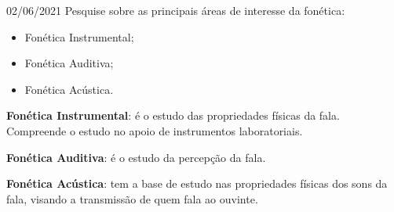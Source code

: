 \documentclass{SchoolBook}
\begin{document}
    \begin{day}{02/06/2021}
        Pesquise sobre as principais áreas de interesse da fonética:
        
        \begin{itemize}[nosep]
            \item Fonética Instrumental;
            \item Fonética Auditiva;
            \item Fonética Acústica.
        \end{itemize}
        
        \noindent\textbf{Fonética Instrumental}: é o estudo das propriedades físicas da fala. Compreende o estudo no apoio de instrumentos laboratoriais.
        
        \noindent\textbf{Fonética Auditiva}: é o estudo da percepção da fala.
        
        \noindent\textbf{Fonética Acústica}: tem a base de estudo nas propriedades físicas dos sons da fala, visando a transmissão de quem fala ao ouvinte.
    \end{day}
\end{document}
